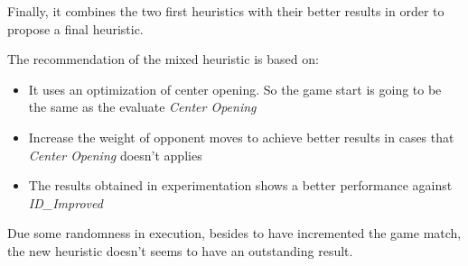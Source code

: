 \documentclass[10pt, a4paper,english]{article}
\begin{document}
Finally, it combines the two first heuristics with their better results in order to propose a final heuristic.

The recommendation of the mixed heuristic is based on:

\begin{itemize}
  \item It uses an optimization of center opening. So the game start is going to be the same as the evaluate \textit{Center Opening} 
  \item Increase the weight of opponent moves to achieve better results in cases that \textit{Center Opening}  doesn't applies 
  \item The results obtained in experimentation shows a better performance against \textit{ID\_Improved}
\end{itemize}


Due some randomness in execution, besides to have incremented the game match, the new heuristic doesn't seems to have an outstanding result.









\end{document}
